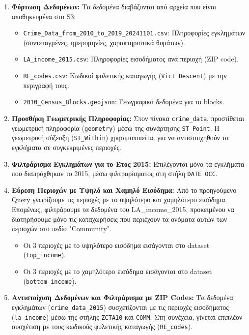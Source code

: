 \documentclass{article}
\begin{document}
\begin{enumerate}
    \item \textbf{Φόρτωση Δεδομένων:} 
    Τα δεδομένα διαβάζονται από αρχεία που είναι αποθηκευμένα στο S3:
    \begin{itemize}
        \item \texttt{Crime\_Data\_from\_2010\_to\_2019\_20241101.csv}: Πληροφορίες εγκλημάτων (συντεταγμένες, ημερομηνίες, χαρακτηριστικά θυμάτων).
        \item \texttt{LA\_income\_2015.csv}: Πληροφορίες εισοδήματος ανά περιοχή (ZIP code).
        \item \texttt{RE\_codes.csv}: Κωδικοί φυλετικής καταγωγής (\texttt{Vict Descent}) με την περιγραφή τους.
        \item \texttt{2010\_Census\_Blocks.geojson}: Γεωγραφικά δεδομένα για τα blocks.
    \end{itemize}

    \item \textbf{Προσθήκη Γεωμετρικής Πληροφορίας:}
    Στον πίνακα \texttt{crime\_data}, προστίθεται γεωμετρική πληροφορία (\texttt{geometry}) μέσω της συνάρτησης \texttt{ST\_Point}. Η γεωμετρική σύζευξη (\texttt{ST\_Within}) χρησιμοποιείται για να αντιστοιχηθούν τα εγκλήματα σε συγκεκριμένες περιοχές.

    \item \textbf{Φιλτράρισμα Εγκλημάτων για το Έτος 2015:}
    Επιλέγονται μόνο τα εγκλήματα που διαπράχθηκαν το 2015, μέσω φιλτραρίσματος στη στήλη \texttt{DATE OCC}.

    \item \textbf{Εύρεση Περιοχών με Υψηλό και Χαμηλό Εισόδημα:}
   Από το προηγούμενο Query γνωρίζουμε τις περιοχές με το υψηλότερο και χαμηλότερο εισόδημα. Επομένως, φιλτράρουμε τα δεδομένα του LA\_income\_2015, προκειμένου να διατηρήσουμε μόνο τις καταχωρήσεις που περιέχουν τα ονόματα αυτών των περιοχών στο πεδίο "Community".
    \begin{itemize}
        \item Οι 3 περιοχές με το υψηλότερο εισόδημα εισάγονται στο dataset (\texttt{top\_income}).
        \item Οι 3 περιοχές με το χαμηλότερο εισόδημα εισάγονται στο dataset (\texttt{bottom\_income}).
    \end{itemize}

    \item \textbf{Αντιστοίχιση Δεδομένων και Φιλτράρισμα με ZIP Codes:}
    Τα δεδομένα εγκλημάτων (\texttt{crime\_data\_2015}) συσχετίζονται με τις περιοχές εισοδήματος (\texttt{la\_income}) μέσω της στήλης \texttt{ZCTA10} και \texttt{COMM}. Στη συνέχεια, γίνεται επιπλέον συσχέτιση με τους κωδικούς φυλετικής καταγωγής (\texttt{RE\_codes}).


\end{enumerate}
\end{document}
